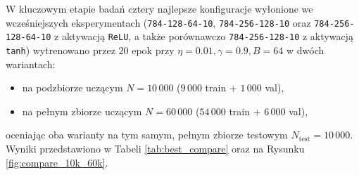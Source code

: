 \documentclass{article}
\begin{document}
W kluczowym etapie badań cztery najlepsze konfiguracje wyłonione we wcześniejszych eksperymentach (\texttt{784-128-64-10}, \texttt{784-256-128-10} oraz \texttt{784-256-128-64-10} z aktywacją \texttt{ReLU}, a także porównawczo \texttt{784-256-128-10} z aktywacją \texttt{tanh}) wytrenowano przez $20$ epok przy $\eta = 0.01, \gamma = 0.9, B = 64$ w dwóch wariantach:
\begin{itemize}
    \item na podzbiorze uczącym $N = 10\,000$ ($9\,000$ train + $1\,000$ val),
    \item na pełnym zbiorze uczącym $N = 60\,000$ ($54\,000$ train + $6\,000$ val),
\end{itemize}
oceniając oba warianty na tym samym, pełnym zbiorze testowym $N_{\text{test}} = 10\,000$. Wyniki przedstawiono w Tabeli \ref{tab:best_compare} oraz na Rysunku \ref{fig:compare_10k_60k}.

\begin{table}[H]
\centering
\caption{Porównanie skuteczności najlepszych konfiguracji sieci MLP uczonych na podzbiorze $N = 10\,000$ oraz na pełnym zbiorze $N = 60\,000$ (ocena na pełnym zbiorze testowym $N_{\text{test}} = 10\,000$, $20$ epok, $\eta = 0.01$, $\gamma = 0.9$, $B = 64$).}
\label{tab:best_compare}
\vspace{0.2cm}
\end{table}
\end{document}

